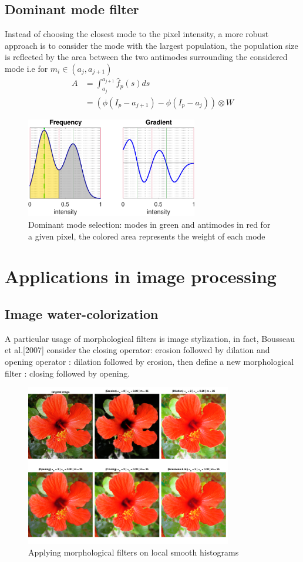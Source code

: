 \documentclass{acmsiggraph}
\begin{document}
\subsection{Dominant mode filter}
Instead of choosing the closest mode to the pixel intensity, a more robust approach is to consider the mode with the largest population, the population size is reflected by the area between the two antimodes surrounding the considered mode i.e for $\mathit{m}_i\in(\mathit{a}_j,\mathit{a}_{j+1})$  
\[\begin{split}
A & = \int_{\mathit{a}_j}^{\mathit{a}_{j+1}}\hat f_p(s)ds\\
& = \left(\phi(I_p-\mathit{a}_{j+1}) - \phi(I_p-\mathit{a}_j) \right)\otimes W
\end{split}\]
\begin{figure}[H]
\centering
\includegraphics[width=7.5cm]{dominant_hist}
\caption{Dominant mode selection: modes in green and antimodes in red for a given pixel, the colored area represents the weight of each mode}
\end{figure}

\section{Applications in image processing}
\subsection{Image water-colorization}
A particular usage of morphological filters is  image stylization, in fact, 
Bousseau et al.[2007] consider the closing operator: erosion followed by dilation and opening operator : dilation followed by erosion, then define a new morphological filter : closing followed by opening.
\begin{figure}[H]
\centering
\includegraphics[width=9cm]{bousseau}
\caption{Applying morphological filters on local smooth histograms}
\end{figure}
\end{document}
